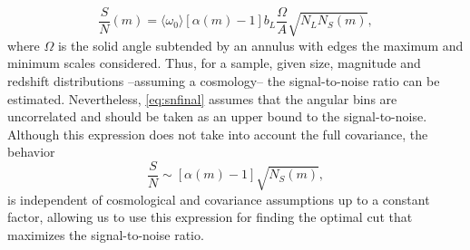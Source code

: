 \begin{equation}
\frac{S}{N}(m) = \langle\omega_0\rangle[\alpha(m)-1]b_L\frac{\Omega}{A}\sqrt{N_LN_S(m)},
\label{eq:snfinal}
\end{equation}
where $\Omega$ is the solid angle subtended by an annulus with edges the maximum and minimum scales considered. Thus, for a sample, given size, magnitude and redshift distributions --assuming a cosmology-- the signal-to-noise ratio can be estimated. Nevertheless, \autoref{eq:snfinal} assumes that the angular bins are uncorrelated and should be taken as an upper bound to the signal-to-noise. Although this expression does not take into account the full covariance, the behavior
\begin{equation}
\frac{S}{N} \sim [\alpha(m)-1]\sqrt{N_S(m)},
\end{equation}
is independent of cosmological and covariance assumptions up to a constant factor, allowing us to use this expression for finding the optimal cut that maximizes the signal-to-noise ratio.


